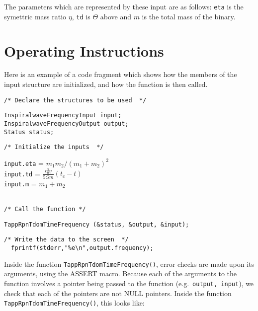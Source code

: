 \documentclass[12pt]{article}
\begin{document}
\vspace{5mm}

The parameters which are represented by these input are as follows: \texttt{eta} is the symettric mass ratio $\eta$, \texttt{td} is $\Theta$ above and $m$ is the total mass of the binary. 



\section{Operating Instructions}

Here is an example of a code fragment which shows how the members of the input structure are initialized, and how the function is then called.

\vspace{5mm}

\noindent
\begin{verbatim}
/* Declare the structures to be used  */
\end{verbatim}
\texttt{InspiralwaveFrequencyInput input;} \\
\texttt{InspiralwaveFrequencyOutput output;} \\
\texttt{Status status;} \\
\begin{verbatim}
/* Initialize the inputs  */
\end{verbatim}
\texttt{input.eta} = $m_{1}m_{2}/(m_{1}+m_{2})^{2}$ \\
\texttt{input.td} = $\frac{c^{3}_{0} \eta}{5Gm} (t_{c} - t)$ \\
\texttt{input.m} = $m_{1}+m_{2}$ \\
\\
\begin{verbatim}
/* Call the function */
\end{verbatim}
\texttt{TappRpnTdomTimeFrequency (\&status, \&output, \&input);}
\begin{verbatim}
/* Write the data to the screen  */
  fprintf(stderr,"%e\n",output.frequency); 
\end{verbatim}

Inside the function \texttt{TappRpnTdomTimeFrequency()}, error checks are made upon its arguments, using the ASSERT macro. Because each of the arguments to the function involves a pointer being passed to the function (e.g.\ \texttt{output, input}), we check that each of the pointers are not NULL pointers.
Inside the function \texttt{TappRpnTdomTimeFrequency()}, this looks like:

\vspace{5mm}
\end{document}
